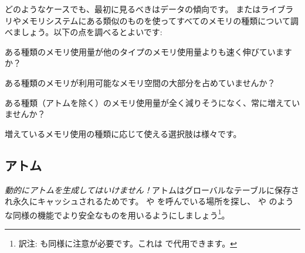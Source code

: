 どのようなケースでも、最初に見るべきはデータの傾向です。 またはライブラリやメモリシステムにある類似のものを使ってすべてのメモリの種類について調べましょう。以下の点を調べるとよいです:

\begin{itemize*}
	\item ある種類のメモリ使用量が他のタイプのメモリ使用量よりも速く伸びていますか？
	\item ある種類のメモリが利用可能なメモリ空間の大部分を占めていませんか？
	\item ある種類（アトムを除く）のメモリ使用量が全く減りそうになく、常に増えていませんか？
\end{itemize*}

増えているメモリ使用の種類に応じて使える選択肢は様々です。

\subsection{アトム}

\emph{動的にアトムを生成してはいけません！}アトムはグローバルなテーブルに保存され永久にキャッシュされるためです。 や  を呼んでいる場所を探し、 や  のような同様の機能でより安全なものを用いるようにしましょう\footnote{訳注:  も同様に注意が必要です。これは  で代用できます。}。

